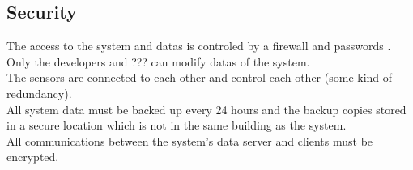 \subsection{Security}
The access to the system and datas is controled by a firewall and passwords .\\
Only the developers and ??? can modify datas of the system.\\
The sensors are connected to each other and control each other (some kind of redundancy).\\
All system data must be backed up every 24 hours and the backup copies stored in a secure location which is not in the same building as the system.\\
All communications between the system's data server and clients must be encrypted.\\




